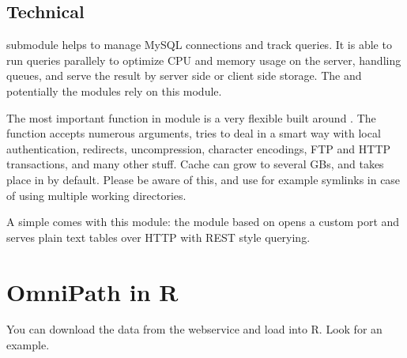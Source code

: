 \documentclass[letterpaper,10pt,english]{sphinxmanual}
\begin{document}
\section{Technical}
\label{\detokenize{index:technical}}
 submodule helps to manage MySQL connections and track queries. It is
able to run queries parallely to optimize CPU and memory usage on the server,
handling queues, and serve the result by server side or client side storage.
The  and potentially the  modules rely on this 
module.

The most important function in module  is a very flexible  built around . The function  accepts
numerous arguments, tries to deal in a smart way with local 
authentication, redirects, uncompression, character encodings, FTP and HTTP
transactions, and many other stuff. Cache can grow to several GBs, and takes
place in  by default. Please be aware of this, and use for example
symlinks in case of using multiple working directories.

A simple  comes with this module: the  module based on
 opens a custom port and serves plain text tables over
HTTP with REST style querying.


\chapter{OmniPath in R}
\label{\detokenize{index:omnipath-in-r}}
You can download the data from the webservice and load into R. Look
 for an
example.
\end{document}
